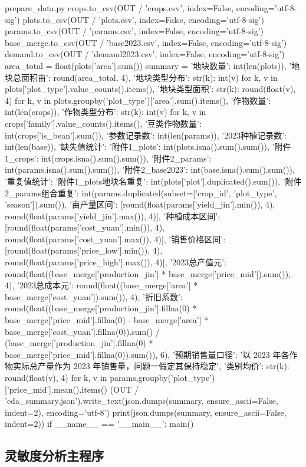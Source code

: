 \documentclass[bwprint]{gmcmthesis}
\begin{document}
\begin{appendices}
\begin{Python}{prepare\_data.py}
    crops.to_csv(OUT / 'crops.csv', index=False, encoding='utf-8-sig')
    plots.to_csv(OUT / 'plots.csv', index=False, encoding='utf-8-sig')
    params.to_csv(OUT / 'params.csv', index=False, encoding='utf-8-sig')
    base_merge.to_csv(OUT / 'base2023.csv', index=False, encoding='utf-8-sig')
    demand.to_csv(OUT / 'demand2023.csv', index=False, encoding='utf-8-sig')
    area_total = float(plots['area'].sum())
    summary = {'地块数量': int(len(plots)), '地块总面积亩': round(area_total, 4), '地块类型分布': {str(k): int(v) for k, v in plots['plot_type'].value_counts().items()}, '地块类型面积': {str(k): round(float(v), 4) for k, v in plots.groupby('plot_type')['area'].sum().items()}, '作物数量': int(len(crops)), '作物类型分布': {str(k): int(v) for k, v in crops['family'].value_counts().items()}, '豆类作物数量': int(crops['is_bean'].sum()), '参数记录数': int(len(params)), '2023种植记录数': int(len(base)), '缺失值统计': {'附件1_plots': int(plots.isna().sum().sum()), '附件1_crops': int(crops.isna().sum().sum()), '附件2_params': int(params.isna().sum().sum()), '附件2_base2023': int(base.isna().sum().sum())}, '重复值统计': {'附件1_plots地块名重复': int(plots['plot'].duplicated().sum()), '附件2_params组合重复': int(params.duplicated(subset=['crop_id', 'plot_type', 'season']).sum())}, '亩产量区间': [round(float(params['yield_jin'].min()), 4), round(float(params['yield_jin'].max()), 4)], '种植成本区间': [round(float(params['cost_yuan'].min()), 4), round(float(params['cost_yuan'].max()), 4)], '销售价格区间': [round(float(params['price_low'].min()), 4), round(float(params['price_high'].max()), 4)], '2023总产值元': round(float((base_merge['production_jin'] * base_merge['price_mid']).sum()), 4), '2023总成本元': round(float((base_merge['area'] * base_merge['cost_yuan']).sum()), 4), '折旧系数': round(float((base_merge['production_jin'].fillna(0) * base_merge['price_mid'].fillna(0) - base_merge['area'] * base_merge['cost_yuan'].fillna(0)).sum() / (base_merge['production_jin'].fillna(0) * base_merge['price_mid'].fillna(0)).sum()), 6), '预期销售量口径': '以 2023 年各作物实际总产量作为 2023 年销售量，问题一假定其保持稳定', '类别均价': {str(k): round(float(v), 4) for k, v in params.groupby('plot_type')['price_mid'].mean().items()}}
    (OUT / 'eda_summary.json').write_text(json.dumps(summary, ensure_ascii=False, indent=2), encoding='utf-8')
    print(json.dumps(summary, ensure_ascii=False, indent=2))
if __name__ == '__main__':
    main()
\end{Python}

\subsection{灵敏度分析主程序}


\end{appendices}
\end{document}
